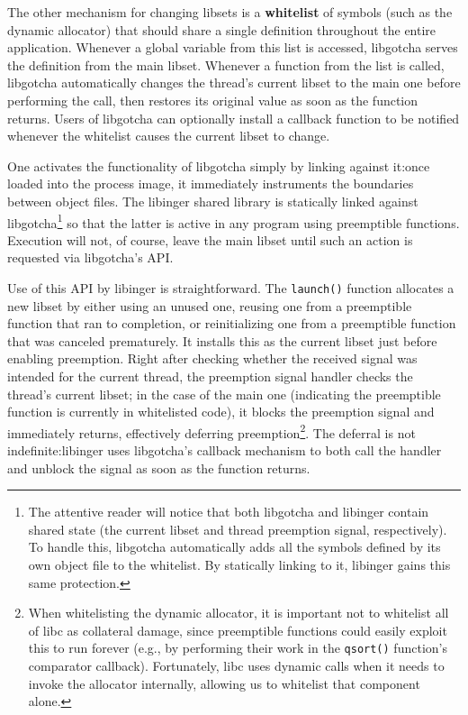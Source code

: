The other mechanism for changing libsets is a \textbf{whitelist} of symbols (such as
the dynamic allocator) that should share a single definition throughout the entire
application.  Whenever a global variable from this list is accessed, libgotcha serves
the definition from the main libset.  Whenever a function from the list is called,
libgotcha automatically changes the thread's current libset to the main one before
performing the call, then restores its original value as soon as the function
returns.  Users of libgotcha can optionally install a callback function to be
notified whenever the whitelist causes the current libset to change.

One activates the functionality of libgotcha simply by linking against it:\@ once
loaded into the process image, it immediately instruments the boundaries between
object files.  The libinger shared library is statically linked against
libgotcha\footnote{The attentive reader will notice that both libgotcha and libinger
contain shared state (the current libset and thread preemption signal, respectively).
To handle this, libgotcha automatically adds all the symbols defined by its own
object file to the whitelist.  By statically linking to it, libinger gains this same
protection.} so that the latter is active in any program using preemptible functions.
Execution will not, of course, leave the main libset until such an action is
requested via libgotcha's API.

Use of this API by libinger is straightforward.  The \texttt{launch()} function
allocates a new libset by either using an unused one, reusing one from a preemptible
function that ran to completion, or reinitializing one from a preemptible function
that was canceled prematurely.  It installs
this as the current libset just before enabling preemption.  Right after checking
whether the received signal was intended for the current thread, the preemption
signal handler checks the thread's current libset; in the case of the main one
(indicating the preemptible function is currently in whitelisted code), it blocks the
preemption signal and immediately returns, effectively deferring
preemption\footnote{When whitelisting the dynamic allocator, it is important not to
whitelist all of libc as collateral damage, since preemptible functions could easily
exploit this to run forever (e.g., by performing their work in the \texttt{qsort()}
function's comparator callback).  Fortunately, libc uses dynamic calls when it needs
to invoke the allocator internally, allowing us to whitelist that component alone.}.
The deferral is not indefinite:\@ libinger uses libgotcha's callback mechanism to
both call the handler and unblock the signal as soon as the function returns.

